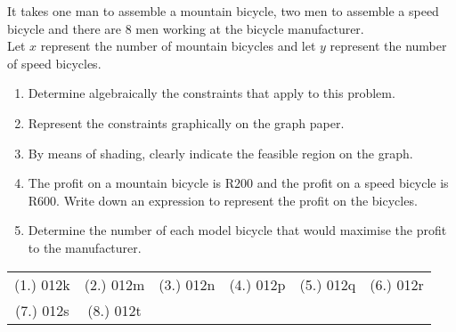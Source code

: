 \begin{eocexercises}{}
\begin{enumerate}
{It takes one man to assemble a mountain bicycle, two men to assemble a speed bicycle and there are $8$ men working at the bicycle manufacturer.\\
Let $x$ represent the number of mountain bicycles and let $y$ represent the number of speed bicycles.
\begin{enumerate}
\item{Determine algebraically the constraints that apply to this problem.}
\item{Represent the constraints graphically on the graph paper.}
\item{By means of shading, clearly indicate the feasible region on the graph.}
\item{The profit on a mountain bicycle is R$200$ and the profit on a speed bicycle is R$600$. Write down an expression to represent the profit on the bicycles.}
\item{Determine the number of each model bicycle that would maximise the profit to the manufacturer.}
\end{enumerate}}
\end{enumerate}



\par \practiceinfo
\par \begin{tabular}[h]{cccccc}
(1.)	012k	&
(2.)	012m	&
(3.)	012n	&
(4.)	012p	&
(5.)	012q	&
(6.)	012r	\\ %
(7.)	012s	&
(8.)	012t	&
\end{tabular}
\end{eocexercises} 




